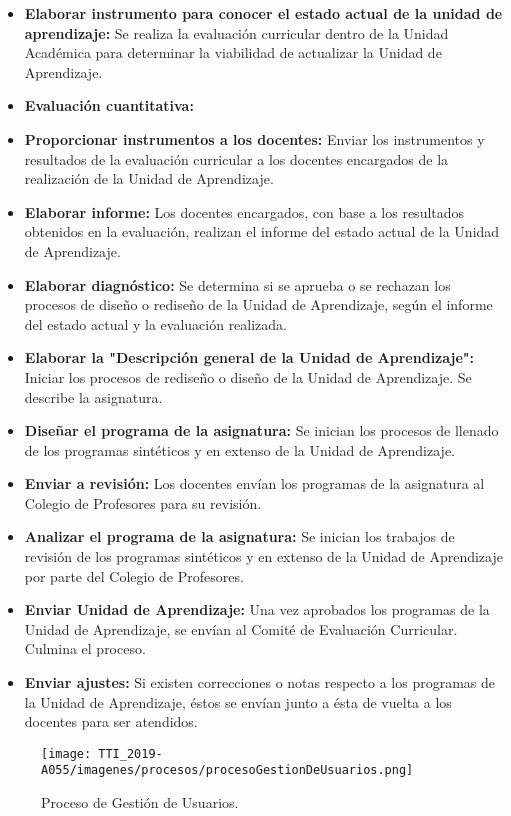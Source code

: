 \begin{itemize}
	\item \textbf{Elaborar instrumento para conocer el estado actual de la unidad de aprendizaje:} Se realiza la evaluación curricular dentro de la Unidad Académica para determinar la viabilidad de actualizar la Unidad de Aprendizaje.
	\item \textbf{Evaluación cuantitativa:}
	\item \textbf{Proporcionar instrumentos a los docentes:} Enviar los instrumentos y resultados de la evaluación curricular a los docentes encargados de la realización de la Unidad de Aprendizaje.
	\item \textbf{Elaborar informe:} Los docentes encargados, con base a los resultados obtenidos en la evaluación, realizan el informe del estado actual de la Unidad de Aprendizaje.
	\item \textbf{Elaborar diagnóstico:} Se determina si se aprueba o se rechazan los procesos de diseño o rediseño de la Unidad de Aprendizaje, según el informe del estado actual y la evaluación realizada.
	\item \textbf{Elaborar la "Descripción general de la Unidad de Aprendizaje":} Iniciar los procesos de rediseño o diseño de la Unidad de Aprendizaje. Se describe la asignatura.
	
	\item \textbf{Diseñar el programa de la asignatura:} Se inician los procesos de llenado de los programas sintéticos y en extenso de la Unidad de Aprendizaje.
	\item \textbf{Enviar a revisión:}  Los docentes envían los programas de la asignatura al Colegio de Profesores para su revisión.
	\item \textbf{Analizar el programa de la asignatura:} Se inician los trabajos de revisión de los programas sintéticos y en extenso de la Unidad de Aprendizaje por parte del Colegio de Profesores.
	
	\item \textbf{Enviar Unidad de Aprendizaje:}  Una vez aprobados los programas de la Unidad de Aprendizaje, se envían al Comité de Evaluación Curricular. Culmina el proceso.
	\item \textbf{Enviar ajustes:} Si existen correcciones o notas respecto a los programas de la Unidad de Aprendizaje, éstos se envían junto a ésta de vuelta a los docentes para ser atendidos.    
\end{itemize}


    \begin{figure}[H]
        \centering
        \texttt{[image: TTI\_2019-A055/imagenes/procesos/procesoGestionDeUsuarios.png]}
        \caption{Proceso de Gestión de Usuarios.}
    \end{figure}
